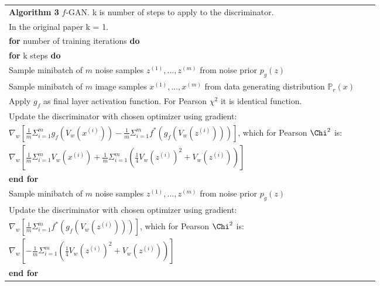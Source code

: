 \documentclass[10pt,twocolumn,letterpaper]{article}
\begin{document}
\begin{table*}[t]
  \centering
  \begin{tabular}{lcr}
   {\bf Algorithm 3} $f$-GAN. k is number of steps to apply to the discriminator. \\
   {\color{black} In the original paper k = 1.} \\ \hline
   {\bf for} number of training iterations {\bf do}\\
   \hspace{4mm} {\bf for} k steps {\bf do}\\
   \hspace{8mm} Sample minibatch of $m$ noise samples ${z^{(1)}, ..., z^{(m)}}$ from noise prior $p_g(z)$\\
   \hspace{8mm} Sample minibatch of $m$ image samples ${x^{(1)}, ..., x^{(m)}}$ from data generating distribution $\mathbb{P}_r(x)$\\
   \hspace{8mm} {\color{red} Apply $g_f$ as final layer activation function. For Pearson $\chi^2$ it is identical function.} \\
   \hspace{8mm} Update the discriminator with chosen optimizer using gradient: \\
   \hspace{16mm} {\color{red} $\nabla_{w} [\frac{1}{m} \Sigma_{i=1}^m g_f(V_w(x^{(i)})) - \frac{1}{m} \Sigma_{i=1}^m f^*(g_f(V_w(z^{(i)})))]$, which for Pearson $\Chi^2$ is:}\\
   \hspace{16mm} {\color{red} $\nabla_{w} [\frac{1}{m} \Sigma_{i=1}^m V_w(x^{(i)}) + \frac{1}{m} \Sigma_{i=1}^m \left( \frac{1}{4} V_w(z^{(i)})^2 + V_w(z^{(i)})\right)]$}\\
   \hspace{4mm} {\bf end for} \\
   \hspace{4mm} Sample minibatch of $m$ noise samples ${z^{(1)}, ..., z^{(m)}}$ from noise prior $p_g(z)$\\
   \hspace{4mm} Update the discriminator with chosen optimizer using gradient: \\
   \hspace{16mm} {\color{red} $\nabla_{w} [\frac{1}{m} \Sigma_{i=1}^m f^*(g_f(V_w(z^{(i)})))]$, which for Pearson $\Chi^2$ is:}\\
   \hspace{16mm} {\color{red} $\nabla_{w} [ - \frac{1}{m} \Sigma_{i=1}^m \left( \frac{1}{4} V_w(z^{(i)})^2 + V_w(z^{(i)})\right)]$}\\
   {\bf end for} \\ \hline
  \end{tabular}
  \label{algo_fgan}
\end{table*}


{\small


}
\end{document}
